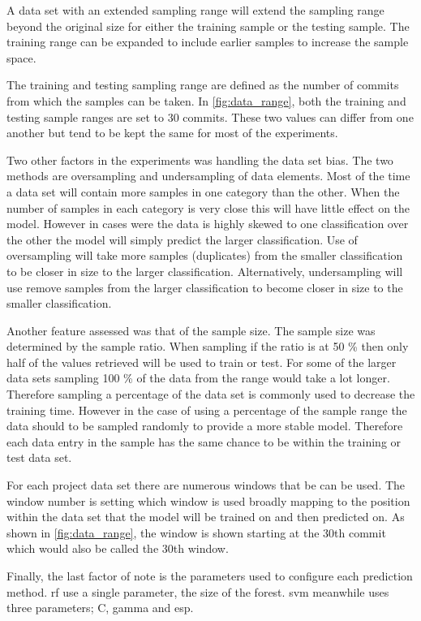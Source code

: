 A data set with an extended sampling range will extend the sampling range beyond the original size for either the training sample or the testing sample. The training range can be expanded to include earlier samples to increase the sample space.

The training and testing sampling range are defined as the number of commits from which the samples can be taken. In \autoref{fig:data_range}, both the training and testing sample ranges are set to 30 commits. These two values can differ from one another but tend to be kept the same for most of the experiments.

Two other factors in the experiments was handling the data set bias. The two methods are oversampling and undersampling of data elements. Most of the time a data set will contain more samples in one category than the other. When the number of samples in each category is very close this will have little effect on the model. However in cases were the data is highly skewed to one classification over the other the model will simply predict the larger classification. Use of oversampling will take more samples (duplicates) from the smaller classification to be closer in size to the larger classification. Alternatively, undersampling will use remove samples from the larger classification to become closer in size to the smaller classification.

Another feature assessed was that of the sample size. The sample size was determined by the sample ratio. When sampling if the ratio is at 50 \% then only half of the values retrieved will be used to train or test. For some of the larger data sets sampling 100 \% of the data from the range would take a lot longer. Therefore sampling a percentage of the data set is commonly used to decrease the training time. However in the case of using a percentage of the sample range the data should to be sampled randomly to provide a more stable model. Therefore each data entry in the sample has the same chance to be within the training or test data set.

For each project data set there are numerous windows that be can be used. The window number is setting which window is used broadly mapping to the position within the data set that the model will be trained on and then predicted on. As shown in \autoref{fig:data_range}, the window is shown starting at the 30th commit which would also be called the 30th window.

Finally, the last factor of note is the parameters used to configure each prediction method. \gls{rf} use a single parameter, the size of the forest. \gls{svm} meanwhile uses three parameters; C, gamma and esp. %

